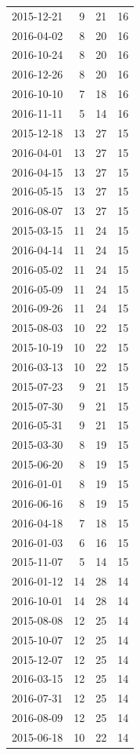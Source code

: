 \begin{tabular}{lrrr}
2015-12-21 & 9 & 21 & 16 \\
2016-04-02 & 8 & 20 & 16 \\
2016-10-24 & 8 & 20 & 16 \\
2016-12-26 & 8 & 20 & 16 \\
2016-10-10 & 7 & 18 & 16 \\
2016-11-11 & 5 & 14 & 16 \\
2015-12-18 & 13 & 27 & 15 \\
2016-04-01 & 13 & 27 & 15 \\
2016-04-15 & 13 & 27 & 15 \\
2016-05-15 & 13 & 27 & 15 \\
2016-08-07 & 13 & 27 & 15 \\
2015-03-15 & 11 & 24 & 15 \\
2016-04-14 & 11 & 24 & 15 \\
2016-05-02 & 11 & 24 & 15 \\
2016-05-09 & 11 & 24 & 15 \\
2016-09-26 & 11 & 24 & 15 \\
2015-08-03 & 10 & 22 & 15 \\
2015-10-19 & 10 & 22 & 15 \\
2016-03-13 & 10 & 22 & 15 \\
2015-07-23 & 9 & 21 & 15 \\
2015-07-30 & 9 & 21 & 15 \\
2016-05-31 & 9 & 21 & 15 \\
2015-03-30 & 8 & 19 & 15 \\
2015-06-20 & 8 & 19 & 15 \\
2016-01-01 & 8 & 19 & 15 \\
2016-06-16 & 8 & 19 & 15 \\
2016-04-18 & 7 & 18 & 15 \\
2016-01-03 & 6 & 16 & 15 \\
2015-11-07 & 5 & 14 & 15 \\
2016-01-12 & 14 & 28 & 14 \\
2016-10-01 & 14 & 28 & 14 \\
2015-08-08 & 12 & 25 & 14 \\
2015-10-07 & 12 & 25 & 14 \\
2015-12-07 & 12 & 25 & 14 \\
2016-03-15 & 12 & 25 & 14 \\
2016-07-31 & 12 & 25 & 14 \\
2016-08-09 & 12 & 25 & 14 \\
2015-06-18 & 10 & 22 & 14 \\

\end{tabular}
